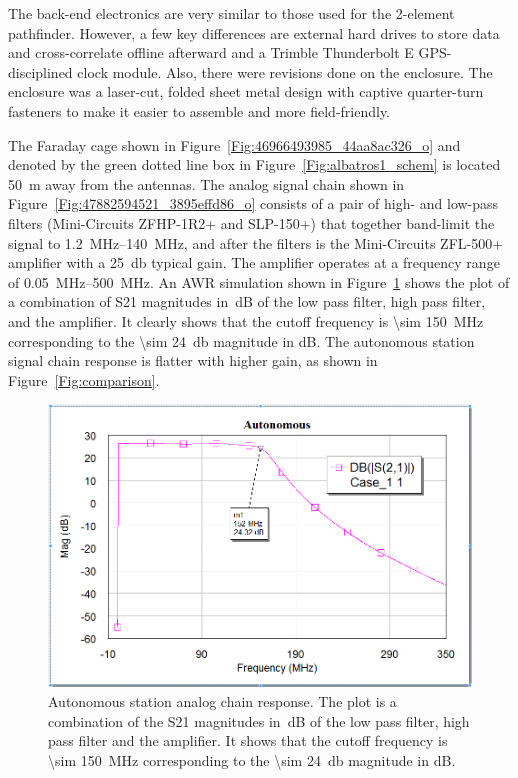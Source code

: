 The back-end electronics are very similar to those used for the 2-element pathfinder. However, a few key differences are external hard drives to store data and cross-correlate offline afterward and a Trimble Thunderbolt E GPS-disciplined clock module. Also, there were revisions done on the enclosure. The enclosure was a laser-cut, folded sheet metal design with captive quarter-turn fasteners to make it easier to assemble and more field-friendly.

The Faraday cage shown in Figure~\ref{Fig:46966493985_44aa8ac326_o} and denoted by the green dotted line box in Figure~\ref{Fig:albatros1_schem} is located \SI{50}{\meter} away from the antennas. The analog signal chain shown in Figure~\ref{Fig:47882594521_3895effd86_o} consists of a pair of high- and low-pass filters (Mini-Circuits ZFHP-1R2+ and SLP-150+) that together band-limit the signal to \SIrange{1.2}{140}{\mega\hertz}, and after the filters is the Mini-Circuits ZFL-500+ amplifier with a \SI{25}{\decibel} typical gain. The amplifier operates at a frequency range of \SIrange{0.05}{500}{\mega\hertz}. An AWR simulation shown in Figure~\ref{Fig:auto} shows the plot of a combination of S21 magnitudes in~dB of the low pass filter, high pass filter, and the amplifier. It clearly shows that the cutoff frequency is \SI{\sim 150}{MHz} corresponding to the \SI{\sim 24}{\decibel} magnitude in dB. The autonomous station signal chain response is flatter with higher gain, as shown in Figure~\ref{Fig:comparison}.

\begin{figure}
	\centering
	\includegraphics[width=0.7\linewidth]{Figures/auto}
	\caption{Autonomous station analog chain response. The plot is a combination of the S21 magnitudes in~dB of the low pass filter, high pass filter and the amplifier. It shows that the cutoff frequency is \SI{\sim 150}{MHz} corresponding to the \SI{\sim 24}{\decibel} magnitude in dB.}
	\label{Fig:auto}
\end{figure}

